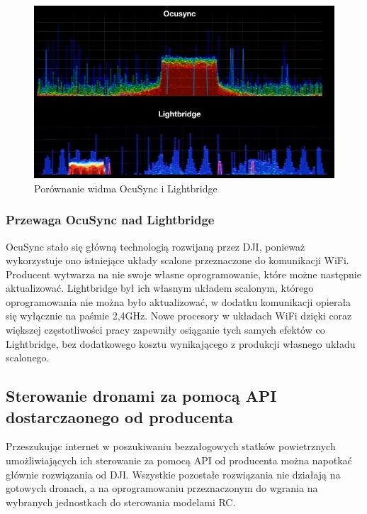 \begin{figure}[!htbp]
\centering
\includegraphics[width=14cm]{./Obrazy/ocusync_vs_lightbridge.png}
\caption{Porównanie widma OcuSync i Lightbridge}
\end{figure}

\newpage

\subsubsection{Przewaga OcuSync nad Lightbridge}
\hspace{1cm}OcuSync stało się główną technologią rozwijaną przez DJI, ponieważ wykorzystuje ono istniejące układy scalone przeznaczone do komunikacji WiFi. Producent wytwarza na nie swoje własne oprogramowanie, które możne następnie aktualizować. Lightbridge był ich własnym układem scalonym, którego oprogramowania nie można było aktualizować, w dodatku komunikacji opierała się wyłącznie na paśmie 2,4GHz. Nowe procesory w układach WiFi dzięki coraz większej częstotliwości pracy zapewniły osiąganie tych samych efektów co Lightbridge, bez dodatkowego kosztu wynikającego z produkcji własnego układu scalonego. 

\subsection{Sterowanie dronami za pomocą API dostarczaonego od producenta}
\hspace{1cm}Przeszukując internet w poszukiwaniu bezzałogowych statków powietrznych umożliwiających ich sterowanie za pomocą API od producenta można napotkać głównie rozwiązania od DJI. Wszystkie pozostałe rozwiązania nie działają na gotowych dronach, a na oprogramowaniu przeznaczonym do wgrania na wybranych jednostkach do sterowania  modelami RC. 

